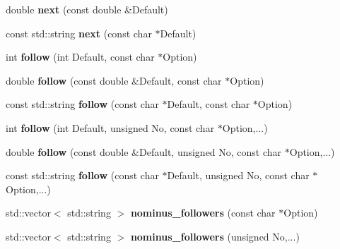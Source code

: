 \begin{DoxyCompactItemize}
\item 
\hypertarget{classGetPot_a0c492a6a937df46a8bf7107c8960743b}{
double {\bfseries next} (const double \&Default)}
\label{classGetPot_a0c492a6a937df46a8bf7107c8960743b}

\item 
\hypertarget{classGetPot_a295a0e34f2553a5ac76ace0adcfa023f}{
const std::string {\bfseries next} (const char $\ast$Default)}
\label{classGetPot_a295a0e34f2553a5ac76ace0adcfa023f}

\item 
\hypertarget{classGetPot_aaa1c2b835b2599c5c087d2d4f82e368b}{
int {\bfseries follow} (int Default, const char $\ast$Option)}
\label{classGetPot_aaa1c2b835b2599c5c087d2d4f82e368b}

\item 
\hypertarget{classGetPot_a855b9098faff198692edae7741573065}{
double {\bfseries follow} (const double \&Default, const char $\ast$Option)}
\label{classGetPot_a855b9098faff198692edae7741573065}

\item 
\hypertarget{classGetPot_a091faf970647b60ffdbc74a27160e6b1}{
const std::string {\bfseries follow} (const char $\ast$Default, const char $\ast$Option)}
\label{classGetPot_a091faf970647b60ffdbc74a27160e6b1}

\item 
\hypertarget{classGetPot_a55bfc61743e387853e6939e7fa70b5ee}{
int {\bfseries follow} (int Default, unsigned No, const char $\ast$Option,...)}
\label{classGetPot_a55bfc61743e387853e6939e7fa70b5ee}

\item 
\hypertarget{classGetPot_af8f391bb9b55d0fd01ce1e74282d2cdf}{
double {\bfseries follow} (const double \&Default, unsigned No, const char $\ast$Option,...)}
\label{classGetPot_af8f391bb9b55d0fd01ce1e74282d2cdf}

\item 
\hypertarget{classGetPot_ad32ef7ad9fdcd024f250da838197d7a8}{
const std::string {\bfseries follow} (const char $\ast$Default, unsigned No, const char $\ast$Option,...)}
\label{classGetPot_ad32ef7ad9fdcd024f250da838197d7a8}

\item 
\hypertarget{classGetPot_ad86cc5f063845dd24f0aa9e8500317b1}{
std::vector$<$ std::string $>$ {\bfseries nominus\_\-followers} (const char $\ast$Option)}
\label{classGetPot_ad86cc5f063845dd24f0aa9e8500317b1}

\item 
\hypertarget{classGetPot_a3c0bc7200bc2558217039050b9087d97}{
std::vector$<$ std::string $>$ {\bfseries nominus\_\-followers} (unsigned No,...)}
\label{classGetPot_a3c0bc7200bc2558217039050b9087d97}


\end{DoxyCompactItemize}
